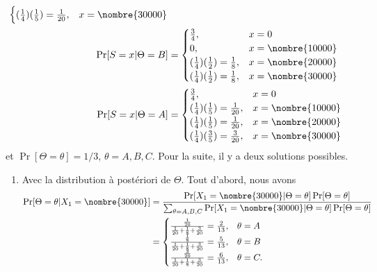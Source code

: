 \begin{exercice}
\begin{sol}
\begin{align*}
\begin{cases}
        (\frac{1}{4}) (\frac{1}{5}) = \frac{1}{20}, & x = \nombre{30000} \\
      \end{cases} \\
      \Pr[S = x|\Theta = B]
      &=
      \begin{cases}
        \frac{3}{4}, & x = 0 \\
        0, & x = \nombre{10000} \\
        (\frac{1}{4}) (\frac{1}{2}) = \frac{1}{8}, & x = \nombre{20000} \\
        (\frac{1}{4}) (\frac{1}{2}) = \frac{1}{8}, & x = \nombre{30000} \\
      \end{cases} \\
      \Pr[S = x|\Theta = A]
      &=
      \begin{cases}
        \frac{3}{4}, & x = 0 \\
        (\frac{1}{4}) (\frac{1}{5}) = \frac{1}{20}, & x = \nombre{10000} \\
        (\frac{1}{4}) (\frac{1}{5}) = \frac{1}{20}, & x = \nombre{20000} \\
        (\frac{1}{4}) (\frac{3}{5}) = \frac{3}{20}, & x = \nombre{30000} \\
      \end{cases}
    \end{align*}
    et $\Pr[\Theta = \theta] = 1/3$, $\theta = A, B, C$. Pour la
    suite, il y a deux solutions possibles.
    \begin{enumerate}[1.]
    \item Avec la distribution à postériori de $\Theta$. Tout d'abord,
      nous avons
      \begin{align*}
        \Pr[\Theta = \theta|X_1 = \nombre{30000}]
        &= \frac{\Pr[X_1 = \nombre{30000}|\Theta = \theta]\Pr[\Theta =
          \theta]}%
        {\sum_{\theta=A,B,C}\Pr[X_1 = \nombre{30000}|\Theta =
          \theta]\Pr[\Theta = \theta]} \\
        &=
        \begin{cases}
          \frac{\frac{1}{20}}%
          {\frac{1}{20} + \frac{1}{8} + \frac{3}{20}} = \frac{2}{13},
          & \theta = A \\
          \frac{\frac{1}{8}}%
          {\frac{1}{20} + \frac{1}{8} + \frac{3}{20}} = \frac{5}{13},
          & \theta = B \\
          \frac{\frac{3}{20}}%
          {\frac{1}{20} + \frac{1}{8} + \frac{3}{20}} = \frac{6}{13},
          & \theta = C.

\end{cases}
\end{align*}
\end{enumerate}
\end{sol}
\end{exercice}
